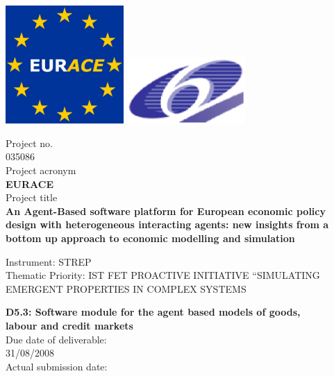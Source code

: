 \documentclass[a4paper,11pt]{article}
\begin{document}
\thispagestyle{empty}

\vspace{\baselineskip}
\includegraphics[width=45mm]{EURACE-Flag.eps} \hfill
\includegraphics[width=45mm]{eu_6.eps}

\begin{center}
Project no.\\
035086\\
Project acronym\\
{\bf EURACE}\\
Project title\\
{\bf An Agent-Based software platform for European economic policy design with heterogeneous interacting agents: new insights from a bottom up approach to economic modelling and simulation}\\
\end{center}

\vspace*{\baselineskip}\noindent
Instrument: STREP\\[\baselineskip]
Thematic Priority: IST FET PROACTIVE INITIATIVE ``SIMULATING EMERGENT PROPERTIES IN COMPLEX SYSTEMS\\

\vspace*{2\baselineskip}
\begin{center}
{\bf
D5.3: Software module for the agent based models of goods,\\
labour and credit
markets\\ }
Due date of deliverable:\\
31/08/2008\\
Actual submission date:\\
\end{center}
\end{document}

